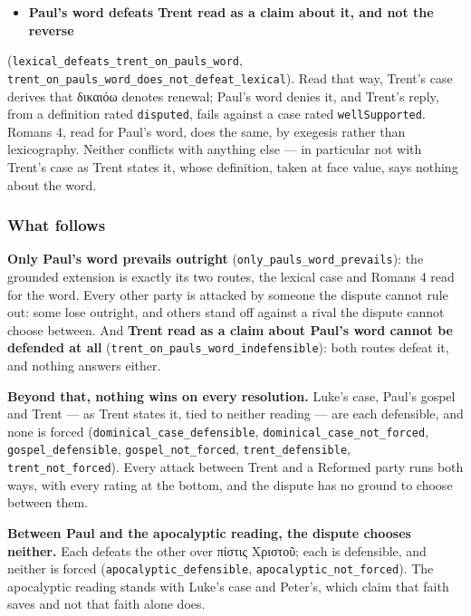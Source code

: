\documentclass[11pt]{article}
\begin{document}
\begin{itemize}
  \item \textbf{Paul's word defeats Trent read as a claim about it, and not the reverse}
\end{itemize}
  (\texttt{lexical\_\allowbreak{}defeats\_\allowbreak{}trent\_\allowbreak{}on\_\allowbreak{}pauls\_\allowbreak{}word},   \texttt{trent\_\allowbreak{}on\_\allowbreak{}pauls\_\allowbreak{}word\_\allowbreak{}does\_\allowbreak{}not\_\allowbreak{}defeat\_\allowbreak{}lexical}). Read that way, Trent's case   derives that δικαιόω denotes renewal; Paul's word denies it, and Trent's   reply, from a definition rated \texttt{disputed}, fails against a case rated   \texttt{well\allowbreak{}Supported}. Romans 4, read for Paul's word, does the same, by exegesis   rather than lexicography. Neither conflicts with anything else — in particular   not with Trent's case as Trent states it, whose definition, taken at face   value, says nothing about the word.

\subsubsection*{What follows}
\textbf{Only Paul's word prevails outright} (\texttt{only\_\allowbreak{}pauls\_\allowbreak{}word\_\allowbreak{}prevails}): the grounded extension is exactly its two routes, the lexical case and Romans 4 read for the word. Every other party is attacked by someone the dispute cannot rule out: some lose outright, and others stand off against a rival the dispute cannot choose between. And \textbf{Trent read as a claim about Paul's word cannot be defended at all} (\texttt{trent\_\allowbreak{}on\_\allowbreak{}pauls\_\allowbreak{}word\_\allowbreak{}indefensible}): both routes defeat it, and nothing answers either.

\textbf{Beyond that, nothing wins on every resolution.} Luke's case, Paul's gospel and Trent — as Trent states it, tied to neither reading — are each defensible, and none is forced (\texttt{dominical\_\allowbreak{}case\_\allowbreak{}defensible}, \texttt{dominical\_\allowbreak{}case\_\allowbreak{}not\_\allowbreak{}forced}, \texttt{gospel\_\allowbreak{}defensible}, \texttt{gospel\_\allowbreak{}not\_\allowbreak{}forced}, \texttt{trent\_\allowbreak{}defensible}, \texttt{trent\_\allowbreak{}not\_\allowbreak{}forced}). Every attack between Trent and a Reformed party runs both ways, with every rating at the bottom, and the dispute has no ground to choose between them.

\textbf{Between Paul and the apocalyptic reading, the dispute chooses neither.} Each defeats the other over πίστις Χριστοῦ; each is defensible, and neither is forced (\texttt{apocalyptic\_\allowbreak{}defensible}, \texttt{apocalyptic\_\allowbreak{}not\_\allowbreak{}forced}). The apocalyptic reading stands with Luke's case and Peter's, which claim that faith saves and not that faith alone does.
\end{document}

